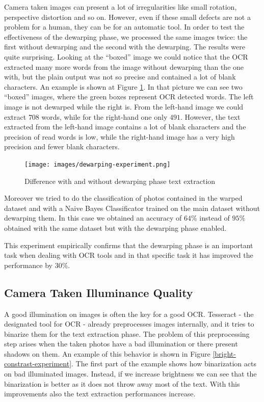 \documentclass[10pt,twocolumn,letterpaper]{article}
\begin{document}
Camera taken images can present a lot of irregularities like small
rotation, perspective distortion and so on. However, even if these
small defects are not a problem for a human, they can be for an
automatic tool. In order to test the effectiveness of the dewarping
phase, we processed the same images twice: the first without
dewarping and the second with the dewarping. The results were quite
surprising. Looking at the ``boxed'' image we could notice
that the OCR extracted many more words from the image without
dewarping than the one with, but the plain output was not so precise
and contained a lot of blank characters. An example is shown at Figure
\ref{dewarping-experiment}. In that picture we can see two ``boxed''
images, where the green boxes represent OCR detected words. The left
image is not dewarped while the right is. From the left-hand image we could
extract $708$ words, while for the right-hand one only $491$. However, the
text extracted from the left-hand image contains a lot of blank characters
and the precision of read words is low, while the right-hand image has a
very high precision and fewer blank characters.

\begin{figure}[b]
  \centering
  \texttt{[image: images/dewarping-experiment.png]}
  \caption{Difference with and without dewarping phase text extraction}
  \label{dewarping-experiment}
\end{figure}

Moreover we tried to do the classification of photos contained in
the warped dataset and with a Naive Bayes Classificator trained on the
main dataset without dewarping them. In this case we obtained an
accuracy of $64\%$ instead of $95\%$ obtained with the same dataset but
with the dewarping phase enabled.

This experiment empirically confirms that the dewarping phase is an
important task when dealing with OCR tools and in that specific task
it has improved the performance by $30\%$.

\subsection{Camera Taken Illuminance Quality}
\label{subsec:camera-taken-illuminance-quality}

A good illumination on images is often the key for a good
OCR. Tesseract - the designated tool for OCR - already preprocesses images
internally, and it tries to binarize them for the text extraction phase.
The problem of this preprocessing step arises when the taken photos
have a bad illumination or there present shadows on them. An example of this
behavior is shown in Figure
\ref{bright-constrast-experiment}. The first part of the example shows
how binarization acts on bad illuminated images. Instead, if we
increase brightness we can see that the binarization is better as it
does not throw away most of the text. With this improvements also the
text extraction performances increase.
\end{document}
